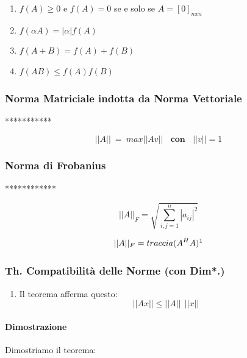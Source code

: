\documentclass{article}
\begin{document}
\begin{enumerate}
    \item $f(A) \geq 0$ e $f(A) = 0$ se e solo se $A = [0]_{nxn}$
    \item $f(\alpha A) = |\alpha|f(A)$
    \item $f(A+B) = f(A) + f(B)$
    \item $f(AB) \leq f(A)f(B)$
\end{enumerate}

\subsubsection{Norma Matriciale indotta da Norma Vettoriale}


***********

\[||A|| \: = \: max||Av|| \: \: \: \: \textbf{con} \: \: \: \: ||v|| = 1\] 

\subsubsection{Norma di Frobanius}

************


\[ ||A||_{F} = \sqrt{\sum^{n}_{i,j=1}|a_{ij}|^2} \]

\[ ||A||_{F} = traccia(A^{H}A)\footnotemark \]


\newpage

\subsubsection{Th. Compatibilità delle Norme (con Dim*.)}

\begin{enumerate}
    \item Il teorema afferma questo:
    \vspace*{10px}
    \[ \boxed{||Ax|| \leq ||A||\:\:||x||} \]
\end{enumerate}

\paragraph{Dimostrazione} Dimostriamo il teorema:
\end{document}
